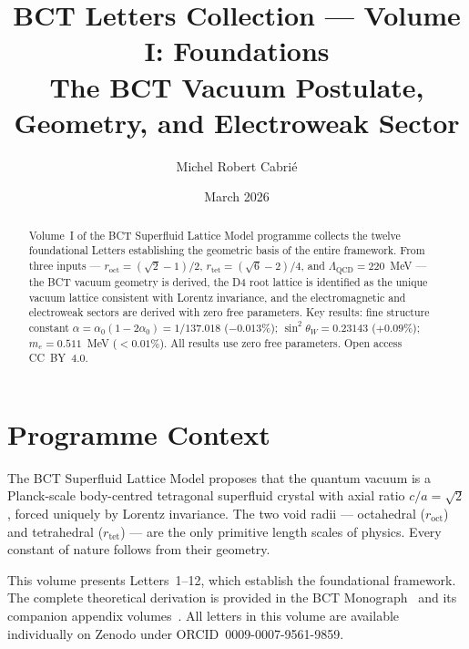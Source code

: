 \documentclass[aps,prl,twocolumn,showpacs,preprintnumbers]{revtex4-2}
\newcommand{\roct}{r_{\mathrm{oct}}}
\newcommand{\rtet}{r_{\mathrm{tet}}}
\newcommand{\LQCD}{\Lambda_{\mathrm{QCD}}}
\begin{document}

\title{BCT Letters Collection --- Volume I: Foundations\\
\large The BCT Vacuum Postulate, Geometry, and Electroweak Sector}

\author{Michel Robert Cabri\'e}

\date{March 2026}

\begin{abstract}
Volume~I of the BCT Superfluid Lattice Model programme collects
the twelve foundational Letters establishing the geometric basis
of the entire framework. From three inputs --- $\roct = (\sqrt{2}-1)/2$,
$\rtet = (\sqrt{6}-2)/4$, and $\LQCD = 220$~MeV --- the BCT vacuum
geometry is derived, the D4 root lattice is identified as the unique
vacuum lattice consistent with Lorentz invariance, and the electromagnetic
and electroweak sectors are derived with zero free parameters.
Key results: fine structure constant $\alpha = \alpha_0(1-2\alpha_0)
= 1/137.018$ ($-0.013\%$); $\sin^2\theta_W = 0.23143$ ($+0.09\%$);
$m_e = 0.511$~MeV ($<0.01\%$). All results use zero free parameters.
Open access CC~BY~4.0.
\end{abstract}

\maketitle

\section*{Programme Context}

The BCT Superfluid Lattice Model proposes that the quantum vacuum is
a Planck-scale body-centred tetragonal superfluid crystal with axial
ratio $c/a = \sqrt{2}$, forced uniquely by Lorentz invariance. The
two void radii --- octahedral ($\roct$) and tetrahedral ($\rtet$) ---
are the only primitive length scales of physics. Every constant of
nature follows from their geometry.

This volume presents Letters~1--12, which establish the foundational
framework. The complete theoretical derivation is provided in the BCT
Monograph~\cite{monograph} and its companion appendix volumes~\cite{appvol1,appvol2}.
All letters in this volume are available individually on Zenodo under
ORCID~0009-0007-9561-9859.
\end{document}
